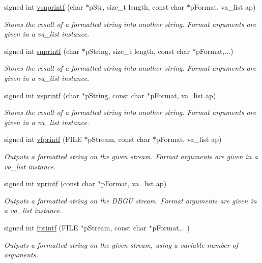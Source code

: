 \begin{DoxyCompactItemize}
signed int \hyperlink{group__printf_ga8f2d28f08e5d66db9a14ed70cb1f4220}{vsnprintf} (char $\ast$p\+Str, size\+\_\+t length, const char $\ast$p\+Format, va\+\_\+list ap)
\begin{DoxyCompactList}\small\item\em Stores the result of a formatted string into another string. Format arguments are given in a va\+\_\+list instance. \end{DoxyCompactList}\item 
signed int \hyperlink{group__printf_gae4d7a9a581baef0b2b2174383580ab15}{snprintf} (char $\ast$p\+String, size\+\_\+t length, const char $\ast$p\+Format,...)
\begin{DoxyCompactList}\small\item\em Stores the result of a formatted string into another string. Format arguments are given in a va\+\_\+list instance. \end{DoxyCompactList}\item 
signed int \hyperlink{group__printf_gac2bd6c4c9ad1b563bdcd20f18a36811a}{vsprintf} (char $\ast$p\+String, const char $\ast$p\+Format, va\+\_\+list ap)
\begin{DoxyCompactList}\small\item\em Stores the result of a formatted string into another string. Format arguments are given in a va\+\_\+list instance. \end{DoxyCompactList}\item 
signed int \hyperlink{group__printf_ga4c938d1cedba90cbc8107400ebea6100}{vfprintf} (F\+I\+L\+E $\ast$p\+Stream, const char $\ast$p\+Format, va\+\_\+list ap)
\begin{DoxyCompactList}\small\item\em Outputs a formatted string on the given stream. Format arguments are given in a va\+\_\+list instance. \end{DoxyCompactList}\item 
signed int \hyperlink{group__printf_gadc27df6594a246219000f9d2a584a3be}{vprintf} (const char $\ast$p\+Format, va\+\_\+list ap)
\begin{DoxyCompactList}\small\item\em Outputs a formatted string on the D\+B\+G\+U stream. Format arguments are given in a va\+\_\+list instance. \end{DoxyCompactList}\item 
signed int \hyperlink{group__printf_ga714a7aeb0b480bc7cc85c1685964861f}{fprintf} (F\+I\+L\+E $\ast$p\+Stream, const char $\ast$p\+Format,...)
\begin{DoxyCompactList}\small\item\em Outputs a formatted string on the given stream, using a variable number of arguments. \end{DoxyCompactList}\item 

\end{DoxyCompactItemize}
